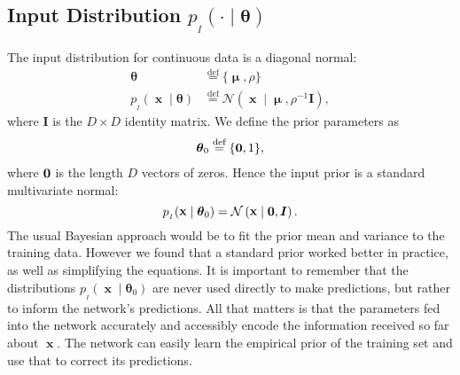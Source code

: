 \documentclass[11pt,table]{article}
\DeclareMathOperator{\x}{\mathbf{x}}
\DeclareMathOperator{\m}{\boldsymbol{\mu}}
\newcommand{\N}[2]{\mathcal{N}\left(#1 , #2\right)}
\newcommand{\I}[1]{\boldsymbol{I}}
\newcommand*{\defeq}{\stackrel{\text{def}}{=}}
\newcommand{\tidx}[2]{#1_{#2}}
\renewcommand{\vec}[1]{\boldsymbol{#1}}
\newcommand{\pars}{\theta}
\newcommand{\parsn}{\vec{\pars}}
\newcommand{\parsnt}[1]{\tidx{\parsn}{#1}}
\newcommand{\0}[1]{\constvec{0}{#1}}
\newcommand{\1}[1]{\constvec{1}{#1}}
\newcommand{\inp}{p_{_I}}
\begin{document}
\subsection{Input Distribution \texorpdfstring{$\inp(\cdot \mid \parsn)$}{}}\label{sec:cts_input}
The input distribution for continuous data is a diagonal normal:
\begin{align}
\parsn &\defeq \{\m, \rho\}\\
\inp(\x \mid \parsn) &\defeq \N{\x \mid \m}{\rho^{-1}\I{D}},
\end{align}
where $\I{D}$ is the $D \times D$ identity matrix. 
We define the prior parameters as
\begin{align}
\parsnt{0} \defeq \{\0{D}, 1\},
\end{align}
where $\0{D}$ is the length $D$ vectors of zeros.
Hence the input prior is a standard multivariate normal:
\begin{equation}
\inp(\x \mid \parsnt{0}) = \N{\x \mid \0{D}}{\I{D}}.
\end{equation}
The usual Bayesian approach would be to fit the prior mean and variance to the training data. 
However we found that a standard prior worked better in practice, as well as simplifying the equations. 
It is important to remember that the distributions $\inp(\x \mid \parsnt{0})$ are never used directly to make predictions, but rather to inform the network's predictions. 
All that matters is that the parameters fed into the network accurately and accessibly encode the information received so far about $\x$. 
The network can easily learn the empirical prior of the training set and use that to correct its predictions.
\end{document}
